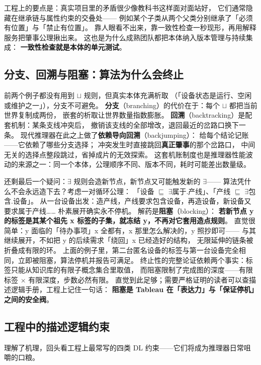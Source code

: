 工程上的要点是：真实项目里的矛盾很少像教科书这样面对面站好，
它们通常隐藏在继承链与属性约束的交叠处——
例如某个子类从两个父类分别继承了「必须有位置」与「禁止有位置」。
靠人眼看不出来，靠一致性检查一秒现形，再用解释服务把肇事公理揪出来。
这也是为什么成熟团队都把本体纳入版本管理与持续集成：
\textbf{一致性检查就是本体的单元测试}。

\subsection{分支、回溯与阻塞：算法为什么会终止}

前两个例子都没有用到 \(\sqcup\) 规则，但真实本体充满析取
（「设备状态是运行、空闲或维护之一」），分支不可避免。
\textbf{分支}（branching）的代价在于：每个 \(\sqcup\) 都把当前世界复制成两份，
嵌套的析取让世界数量指数膨胀。
\textbf{回溯}（backtracking）是配套机制：某条支线冲突后，
撤销该支线的全部增改，退回最近的岔路口换下一条。
现代推理器在此之上做了\textbf{依赖导向回溯}（backjumping）：
给每个结论记账——它依赖了哪些分支选择；
冲突发生时直接跳回\textbf{真正肇事}的那个岔路口，
中间无关的选择点整段跳过，省掉成片的无效探索。
这套机账制度也是推理器性能波动的来源之一：同一个本体，公理顺序不同、版本不同，耗时可能差出数量级。

还剩最后一个疑问：\(\exists\) 规则会造新节点，新节点又可能触发新的 \(\exists\)——
算法凭什么不会永远造下去？考虑一对循环公理：
「设备 \(\sqsubseteq\) \(\exists\)属于.产线」、「产线 \(\sqsubseteq\) \(\exists\)包含.设备」。
从一台设备出发：造产线，产线要求包含设备，再造设备，新设备又要求属于产线……
朴素展开确实永不停机。
解药是\textbf{阻塞}（blocking）：
\textbf{若新节点 y 的标签是其某个祖先 x 标签的子集，就冻结 y，不再对它套用造点规则}。
直觉很简单：y 面临的「待办事项」x 全都有，x 那里怎么解决的，y 照抄即可——
与其继续展开，不如把 y 的后续需求「绕回」x 已经造好的结构，
无限延伸的链条被折叠成有限的环。
上面的例子里，第二台匿名设备的标签与第一台设备完全相同，立即被阻塞，算法停机并报告可满足。
终止性的完整论证依赖两个事实：标签只能从知识库的有限子概念集合里取值，
而阻塞限制了完成图的深度——有限标签 \(\times\) 有限深度，步数必然有限。
直觉到此足够；需要严格证明的读者可以查描述逻辑手册，工程上记住一句话：
\textbf{阻塞是 Tableau 在「表达力」与「保证停机」之间的安全阀}。

\subsection{工程中的描述逻辑约束}

理解了机理，回头看工程上最常写的四类 DL 约束——它们将成为推理器日常咀嚼的口粮。

